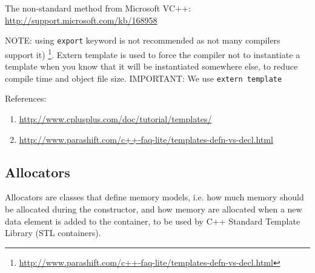 \begin{mdframed}
The non-standard method from Microsoft VC++:
\url{http://support.microsoft.com/kb/168958}

NOTE: using \verb!export! keyword is not recommended as not many compilers
support it) \footnote{\url{http://www.parashift.com/c++-faq-lite/templates-defn-vs-decl.html}}.
Extern template is used to force the compiler not to instantiate a template when
you know that it will be instantiated somewhere else, to reduce compile time and
object file size. IMPORTANT: We use \verb!extern template!

\end{mdframed}



References:
\begin{enumerate}
  \item \url{http://www.cplusplus.com/doc/tutorial/templates/}
  \item \url{http://www.parashift.com/c++-faq-lite/templates-defn-vs-decl.html}
\end{enumerate}


\subsection{Allocators}
\label{sec:C++98_allocators}

Allocators are classes that define memory models, i.e. how much memory should
be allocated during the constructor, and how memory are allocated when a new
data element is added to the container, to be used by C++ Standard Template
Library (STL containers).

